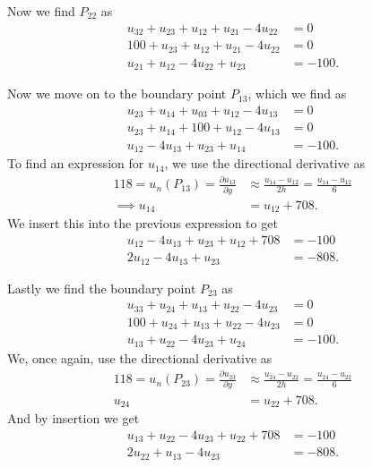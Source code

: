 \begin{derivation}
  Now we find $P_{22}$ as
  \begin{align*}
    u_{32} + u_{23} + u_{12} + u_{21} - 4u_{22} &= 0 \\
    100 + u_{23} + u_{12} + u_{21} - 4u_{22} &= 0 \\
    u_{21} + u_{12} - 4u_{22} + u_{23} &= -100
  .\end{align*}

  Now we move on to the boundary point $P_{13}$, which we find as
  \begin{align*}
    u_{23} + u_{14} + u_{03} + u_{12} - 4u_{13} &= 0 \\
    u_{23} + u_{14} + 100 + u_{12} - 4u_{13} &= 0 \\
    u_{12} - 4u_{13}+ u_{23} + u_{14} &= -100
  .\end{align*}
  To find an expression for $u_{14}$, we use the directional derivative as
  \begin{align*}
    118 = u_n(P_{13}) = \frac{\partial u_{13}}{\partial y} &\approx \frac{u_{14} - u_{12}}{2h} = \frac{u_{14} - u_{12}}{6} \\
    \implies u_{14} &= u_{12} + 708
  .\end{align*}
  We insert this into the previous expression to get
  \begin{align*}
    u_{12} - 4u_{13} + u_{23} + u_{12} + 708 &= -100 \\
    2u_{12} - 4u_{13} + u_{23} &= -808
  .\end{align*}

  Lastly we find the boundary point $P_{23}$ as
  \begin{align*}
    u_{33} + u_{24} + u_{13} + u_{22} - 4u_{23} &= 0 \\
    100 + u_{24} + u_{13} + u_{22} - 4u_{23} &= 0 \\
    u_{13} + u_{22} - 4u_{23} + u_{24} &= -100
  .\end{align*}
  We, once again, use the directional derivative as
  \begin{align*}
    118 = u_n(P_{23}) = \frac{\partial u_{23}}{\partial y} &\approx \frac{u_{24} - u_{22}}{2h} = \frac{u_{24} - u_{22}}{6} \\
    u_{24} &= u_{22} + 708
  .\end{align*}
  And by insertion we get
  \begin{align*}
    u_{13} + u_{22} - 4u_{23} + u_{22} + 708 &= -100 \\
    2u_{22} + u_{13} - 4u_{23} &= -808
  .\end{align*}
\end{derivation}

